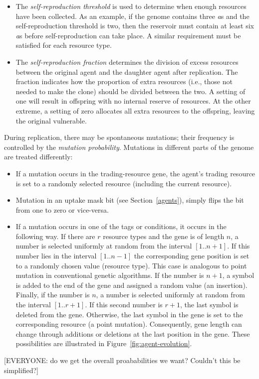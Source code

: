 \begin{itemize}

\item The {\em self-reproduction threshold\/} is used to determine
when enough resources have been collected.  As an example, if the
genome contains three {\em a}s and the self-reproduction threshold is
two, then the reservoir must contain at least six {\em a}s before
self-reproduction can take place. A similar requirement must be
satisfied for each resource type.

\item The {\em self-reproduction fraction\/} determines the division
  of excess resources between the original agent and the daughter
  agent after replication.  The fraction indicates how the proportion
  of extra resources (i.e., those not needed to make the clone) should
  be divided between the two.  A setting of one will result in
  offspring with no internal reserve of resources.  At the other
  extreme, a setting of zero allocates all extra resources to the
  offspring, leaving the original vulnerable.
\end{itemize}

During replication, there may be spontaneous mutations; their
frequency is controlled by the {\em mutation probability}.  Mutations
in different parts of the genome are treated differently:
\begin{itemize}
\item If a mutation occurs in the trading-resource gene, the agent's
  trading resource is set to a randomly selected resource (including
  the current resource).

\item Mutation in an uptake mask bit (see Section~\ref{agents}), simply
  flips the bit from one to zero or vice-versa.

\item If a mutation occurs in one of the tags or conditions, it occurs
  in the following way.  If there are $r$ resource types and the gene
  is of length $n$, a number is selected uniformly at random from the
  interval $[1..n+1]$. If this number lies in the interval $[1..n-1]$
  the corresponding gene position is set to a randomly chosen value
  (resource type).  This case is analogous to point mutation in
  conventional genetic algorithms.  If the number is $n+1$, a symbol
  is added to the end of the gene and assigned a random value
  (an insertion).  Finally, if the number is $n$, a number is selected
  uniformly at random from the interval $[1..r+1]$.  If this second
  number is $r+1$, the last symbol is deleted from the gene.
  Otherwise, the last symbol in the gene is set to the corresponding
  resource (a point mutation).
  Consequently, gene length can change through additions or deletions
  at the last position in the gene.  These possibilities are
  illustrated in Figure~\ref{fig:agent-evolution}.
\end{itemize}
[EVERYONE: do we get the overall proababilities we want?  Couldn't this
be simplified?]


